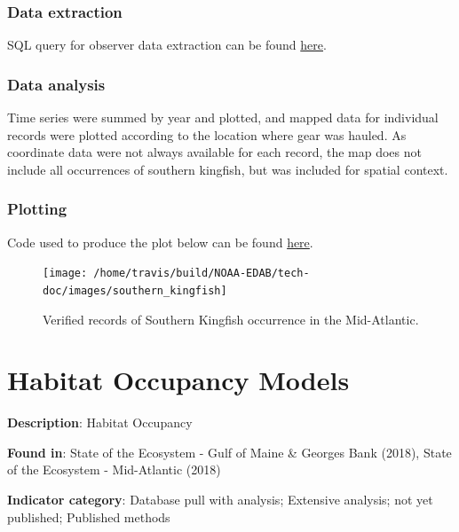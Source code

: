 \documentclass[
]{book}
\begin{document}
\hypertarget{data-extraction-23}{%
\subsection{Data extraction}\label{data-extraction-23}}

SQL query for observer data extraction can be found \href{https://github.com/NOAA-EDAB/tech-doc/blob/master/R/stored_scripts/observer_data_extraction.sql}{here}.

\hypertarget{data-analysis-24}{%
\subsection{Data analysis}\label{data-analysis-24}}

Time series were summed by year and plotted, and mapped data for individual records were plotted according to the location where gear was hauled. As coordinate data were not always available for each record, the map does not include all occurrences of southern kingfish, but was included for spatial context.

\hypertarget{plotting-18}{%
\subsection{Plotting}\label{plotting-18}}

Code used to produce the plot below can be found \href{https://github.com/NOAA-EDAB/tech-doc/tree/master/R/stored_scripts/observer_data_plotting.R}{here}.

\begin{figure}

{\centering \texttt{[image: /home/travis/build/NOAA-EDAB/tech-doc/images/southern\_kingfish]} 

}

\caption{Verified records of Southern Kingfish occurrence in the Mid-Atlantic.}\label{fig:SK-plot}
\end{figure}

\hypertarget{hab-occu}{%
\chapter{Habitat Occupancy Models}\label{hab-occu}}

\textbf{Description}: Habitat Occupancy

\textbf{Found in}: State of the Ecosystem - Gulf of Maine \& Georges Bank (2018), State of the Ecosystem - Mid-Atlantic (2018)

\textbf{Indicator category}: Database pull with analysis; Extensive analysis; not yet published; Published methods
\end{document}
